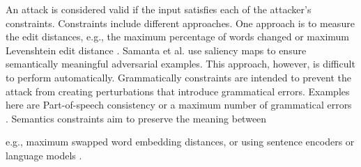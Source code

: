     An attack is considered valid if the input satisfies each of the attacker's constraints. 
    Constraints include different approaches. One approach is to measure the edit distances, e.g., the maximum percentage of words changed \cite{ebrahimi2017hotflip} or maximum Levenshtein edit distance \cite{gao2018black}. Samanta et al. use saliency maps to ensure semantically meaningful adversarial examples\cite{samanta2017towards}. This approach, however, is difficult to perform automatically. Grammatically constraints are intended to prevent the attack from creating perturbations that introduce grammatical errors. Examples here are Part-of-speech consistency or a maximum number of grammatical errors \cite{ebrahimi2017hotflip, jin2019bert}. Semantics constraints aim to preserve the meaning between 
    
    e.g., maximum swapped word embedding distances, or using sentence encoders or language models \cite{cer2018universal, garg2020bae, jin2019bert, li2018textbugger, alzantot2018generating, ebrahimi2017hotflip}.


